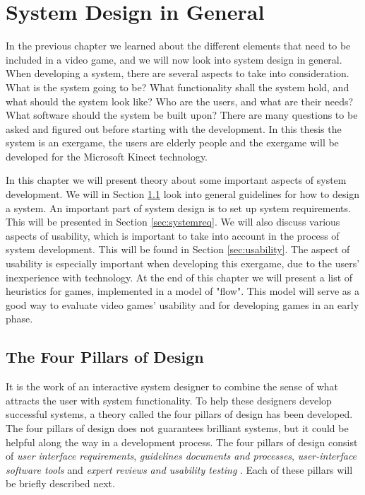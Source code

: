 \chapter{System Design in General}
\label{chap:generalsystemdesign}
In the previous chapter we learned about the different elements that need to be included in a video game, and we will now look into system design in general. When developing a system, there are several aspects to take into consideration. What is the system going to be? What functionality shall the system hold, and what should the system look like? Who are the users, and what are their needs? What software should the system be built upon? There are many questions to be asked and figured out before starting with the development. In this thesis the system is an exergame, the users are elderly people and the exergame will be developed for the Microsoft Kinect technology.

In this chapter we will present theory about some important aspects of system development. We will in Section \ref{sec:fourpillarsofdesign} look into general guidelines for how to design a system. An important part of system design is to set up system requirements. This will be presented in Section \ref{sec:systemreq}. We will also discuss various aspects of usability, which is important to take into account in the process of system development. This will be found in Section \ref{sec:usability}. The aspect of usability is especially important when developing this exergame, due to the users' inexperience with technology.  At the end of this chapter we will present a list of heuristics for games, implemented in a model of "flow". This model will serve as a good way to evaluate video games' usability and for developing games in an early phase.

\section{The Four Pillars of Design}
\label{sec:fourpillarsofdesign}
It is the work of an interactive system designer to combine the sense of what attracts the user with system functionality. To help these designers develop successful systems, a theory called the four pillars of design has been developed. The four pillars of design does not guarantees brilliant systems, but it could be helpful along the way in a development process. The four pillars of design consist of \emph{user interface requirements}, \emph{guidelines documents and processes}, \emph{user-interface software tools} and \emph{expert reviews and usability testing} \cite{mmi}. Each of these pillars will be briefly described next. 

